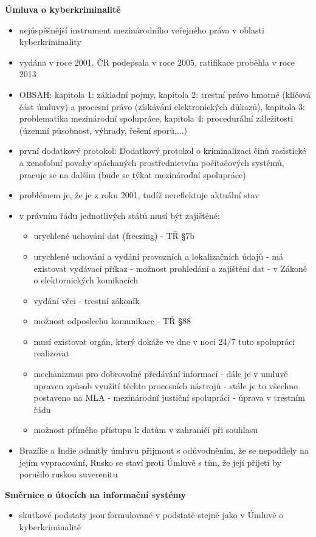 \textbf{Úmluva o kyberkriminalitě} 
\begin{itemize}
    \item nejúspěšnější instrument mezinárodního veřejného práva v oblasti kyberkriminality
    \item vydána v roce 2001, ČR podepsala v roce 2005, ratifikace proběhla v roce 2013
    \item OBSAH: kapitola 1: základní pojmy, kapitola 2: trestní právo hmotné (klíčová část úmluvy) a procesní právo (získávání elektronických důkazů), kapitola 3: problematika mezinárodní spolupráce, kapitola 4:  procedurální záležitosti (územní působnost, výhrady, řešení sporů,...)
    \item první dodatkový protokol: Dodatkový protokol o kriminalizaci činů rasistické a xenofobní povahy spáchaných prostřednictvím počítačových systémů, pracuje se na dalším (bude se týkat mezinárodní spolupráce)
    \item problémem je, že je z roku 2001, tudíž nereflektuje aktuální stav
    \item v právním řádu jednotlivých států musí být zajištěné:
    \begin{itemize}
        \item urychlené uchování dat (freezing) - TŘ §7b
        \item  urychlené uchování a vydání provozních a lokalizačních údajů - má existovat vydávací příkaz -
        možnost prohledání a zajištění dat - v Zákoně o elektornických komikacích
        \item vydání věci - trestní zákoník
        \item  možnost odposlechu komunikace - TŘ §88
        \item musí existovat orgán, který dokáže ve dne v noci 24/7 tuto spolupráci realizovat
        \item  mechanizmus pro dobrovolné předávání informací - dále je v umluvě upraven způsob využití
        těchto procesních nástrojů - stále je to všechno postaveno na MLA - mezinárodní justiční
        spolupráci - úprava v trestním řádu
        \item možnost přímého přístupu k datům v zahraničí při souhlasu
    \end{itemize}
    \item Brazílie a Indie odmítly úmluvu přijmout s odůvodněním, že se nepodílely na jejím vypracování, Rusko se staví proti Úmluvě s tím, že její přijetí by porušilo ruskou suverenitu
\end{itemize}
\textbf{Směrnice o útocích na informační
systémy}
\begin{itemize}
    \item skutkové podstaty jsou formulované v podstatě stejně jako v Úmluvě o kyberkriminalitě
\end{itemize}

